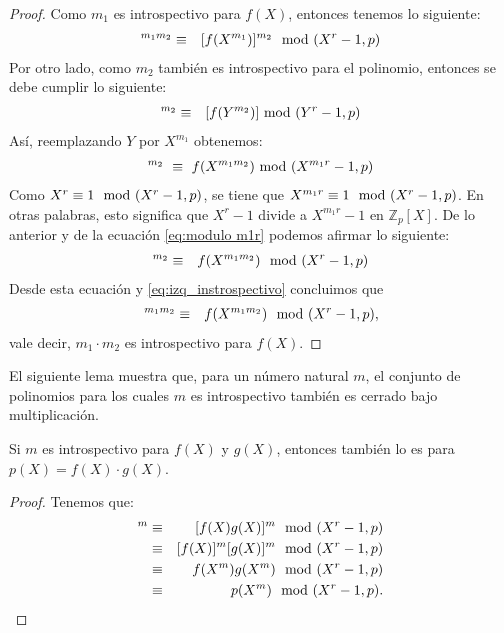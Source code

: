 	\begin{proof}
Como $m_1$ es introspectivo para $f(X)$, entonces tenemos lo siguiente:
			\begin{eqnarray}
			[f(X)]^{m_1m_2}& \equiv &[f(X^{m_1})]^{m_2}\modulop\label{eq:izq_instrospectivo}
			\end{eqnarray}
Por otro lado, como $m_2$ también es introspectivo para el polinomio,
entonces se debe cumplir lo siguiente:
			\begin{eqnarray*}
				[f(Y)]^{m_2} & \equiv & [f(Y^{m_2})] \moduloy
		        \end{eqnarray*}
Así, reemplazando $Y$ por $X^{m_1}$ obtenemos:                        
			\begin{eqnarray}
		          [f(X^{m_1})]^{m_2}\ \equiv \ f(X^{m_1m_2})\modulomr\label{eq:modulo m1r}
		\end{eqnarray}
		Como $X^{r} \equiv  1\mod (X^r-1,p)$, se tiene que $X^{m_1r}\equiv 1\mod (X^r-1,p)$. En otras palabras, esto significa que $X^r -1$ divide a $X^{m_1r}-1$ en $\mathbb{Z}_p[X]$. 
De lo anterior y  de la ecuación \eqref{eq:modulo m1r} podemos afirmar lo siguiente:
\begin{eqnarray*}
  [f(X^{m_1})]^{m_2}&\equiv & f(X^{m_1m_2})\modulop
		\end{eqnarray*}
Desde esta ecuación y \eqref{eq:izq_instrospectivo} concluimos que
\begin{eqnarray*}
  [f(X)]^{m_1m_2} & \equiv & f(X^{m_1m_2})\modulop,
\end{eqnarray*}
vale decir, $m_1\cdot m_2$ es introspectivo para $f(X)$.	
	\end{proof}
	El siguiente lema muestra que, para un número natural $m$, el conjunto de polinomios para los cuales $m$ es introspectivo también es cerrado bajo multiplicación.
	\begin{lemma}\label{lem-introspectivo_bajo mult}
		Si $m$ es introspectivo para $f(X)$ y $g(X)$, entonces también lo es para $p(X) = f(X)\cdot g(X)$.
	\end{lemma}
	\begin{proof}Tenemos que:
		\begin{eqnarray*}
			[p(X)]^m &\equiv & [f(X)g(X)]^m \modulop\\
			&\equiv &[f(X)]^m [g(X)]^m \modulop\\
			&\equiv &f(X^m) g(X^m) \modulop\\
			&\equiv &p(X^m) \modulop.
		\end{eqnarray*}
	\end{proof}
